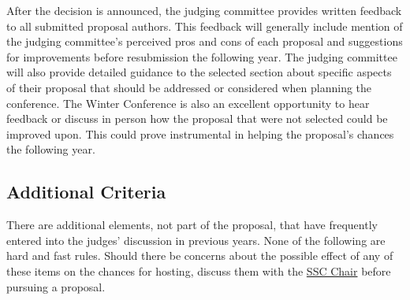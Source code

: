 \documentclass[12pt]{article}
\begin{document}
After the decision is announced, the judging committee provides written feedback to all submitted proposal authors.
This feedback will generally include mention of the judging committee’s perceived pros and cons of each proposal and suggestions for improvements
before resubmission the following year.
The judging committee will also provide
detailed guidance to the selected section about specific aspects of their proposal that should be addressed or considered when planning the conference.
The Winter Conference is also an excellent opportunity to hear feedback or discuss in person how the proposal that were not selected could be improved upon.
This could prove instrumental in helping the proposal's chances the following year.

\subsection{Additional Criteria}
There are additional elements, not part of the proposal, that have frequently entered into the judges’ discussion in previous years.
None of the following are hard and fast rules.
Should there be concerns about the possible effect of any of these items on the chances for hosting, discuss them with the \href{mailto:sscChair@gmail.com}{SSC Chair} before pursuing a proposal.
\end{document}
